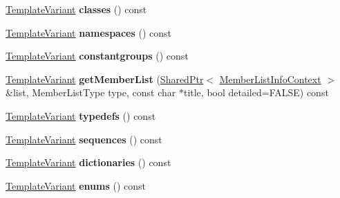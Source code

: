 \begin{DoxyCompactItemize}
\mbox{\hyperlink{class_template_variant}{Template\+Variant}} {\bfseries classes} () const
\item 
\mbox{\label{class_namespace_context_1_1_private_a88935366b704de0be1ab7193adf9a616}} 
\mbox{\hyperlink{class_template_variant}{Template\+Variant}} {\bfseries namespaces} () const
\item 
\mbox{\label{class_namespace_context_1_1_private_ac88c00a8e0cfa165ba2189571870c84d}} 
\mbox{\hyperlink{class_template_variant}{Template\+Variant}} {\bfseries constantgroups} () const
\item 
\mbox{\label{class_namespace_context_1_1_private_a0376ced59cba043c13f01b7b0622cfc5}} 
\mbox{\hyperlink{class_template_variant}{Template\+Variant}} {\bfseries get\+Member\+List} (\mbox{\hyperlink{class_shared_ptr}{Shared\+Ptr}}$<$ \mbox{\hyperlink{class_member_list_info_context}{Member\+List\+Info\+Context}} $>$ \&list, Member\+List\+Type type, const char $\ast$title, bool detailed=F\+A\+L\+SE) const
\item 
\mbox{\label{class_namespace_context_1_1_private_a60839a3ccc0ab2e78b7ff3c24135e535}} 
\mbox{\hyperlink{class_template_variant}{Template\+Variant}} {\bfseries typedefs} () const
\item 
\mbox{\label{class_namespace_context_1_1_private_a597dbf9a47c511816c53c9fbbec4cb63}} 
\mbox{\hyperlink{class_template_variant}{Template\+Variant}} {\bfseries sequences} () const
\item 
\mbox{\label{class_namespace_context_1_1_private_a780f8ec73d1b07df433434e7300701a6}} 
\mbox{\hyperlink{class_template_variant}{Template\+Variant}} {\bfseries dictionaries} () const
\item 
\mbox{\label{class_namespace_context_1_1_private_a9c15739bb12c9edf7b564a922e329434}} 
\mbox{\hyperlink{class_template_variant}{Template\+Variant}} {\bfseries enums} () const
\item 
\mbox{\label{class_namespace_context_1_1_private_aaaa1f32e25ae337095c45feacac9aafd}} 

\end{DoxyCompactItemize}
